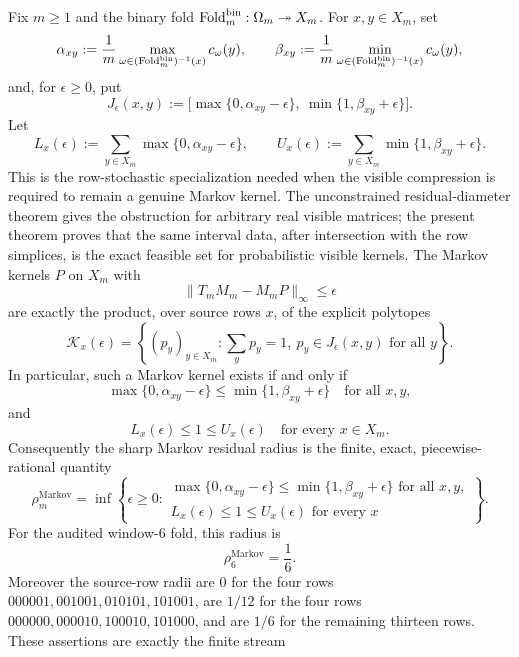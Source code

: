 \begin{theorem}\label{thm:foldbin-stochastic-budget-classification}
Fix \(m\ge1\) and the binary fold \(\operatorname{Fold}_m^{\mathrm{bin}}:\Omega_m\twoheadrightarrow X_m\).  For \(x,y\in X_m\), set
\[
\alpha_{xy}:=\frac{1}{m}\max_{\omega\in(\operatorname{Fold}_m^{\mathrm{bin}})^{-1}(x)}c_\omega(y),
\qquad
\beta_{xy}:=\frac{1}{m}\min_{\omega\in(\operatorname{Fold}_m^{\mathrm{bin}})^{-1}(x)}c_\omega(y),
\]
and, for \(\epsilon\ge0\), put
\[
J_\epsilon(x,y):=
\bigl[\max\{0,\alpha_{xy}-\epsilon\},\ \min\{1,\beta_{xy}+\epsilon\}\bigr].
\]
Let
\[
L_x(\epsilon):=\sum_{y\in X_m}\max\{0,\alpha_{xy}-\epsilon\},
\qquad
U_x(\epsilon):=\sum_{y\in X_m}\min\{1,\beta_{xy}+\epsilon\}.
\]
This is the row-stochastic specialization needed when the visible compression is required to remain a genuine Markov kernel.  The unconstrained residual-diameter theorem gives the obstruction for arbitrary real visible matrices; the present theorem proves that the same interval data, after intersection with the row simplices, is the exact feasible set for probabilistic visible kernels.  The Markov kernels \(P\) on \(X_m\) with
\[
\|T_mM_m-M_mP\|_\infty\le\epsilon
\]
are exactly the product, over source rows \(x\), of the explicit polytopes
\[
\mathcal K_x(\epsilon)=
\left\{(p_y)_{y\in X_m}:
\sum_y p_y=1,
\ p_y\in J_\epsilon(x,y)\text{ for all }y
\right\}.
\]
In particular, such a Markov kernel exists if and only if
\[
\max\{0,\alpha_{xy}-\epsilon\}\le \min\{1,\beta_{xy}+\epsilon\}
\quad\text{for all }x,y,
\]
and
\[
L_x(\epsilon)\le1\le U_x(\epsilon)
\quad\text{for every }x\in X_m.
\]
Consequently the sharp Markov residual radius is the finite, exact, piecewise-rational quantity
\[
\rho_m^{\mathrm{Markov}}=
\inf\left\{\epsilon\ge0:
\begin{array}{l}
\max\{0,\alpha_{xy}-\epsilon\}\le \min\{1,\beta_{xy}+\epsilon\}\text{ for all }x,y,\\[2pt]
L_x(\epsilon)\le1\le U_x(\epsilon)\text{ for every }x
\end{array}
\right\}.
\]
For the audited window-\(6\) fold, this radius is
\[
\rho_6^{\mathrm{Markov}}=\frac16.
\]
Moreover the source-row radii are \(0\) for the four rows
\(000001,001001,010101,101001\), are \(1/12\) for the four rows
\(000000,000010,100010,101000\), and are \(1/6\) for the remaining thirteen rows.
These assertions are exactly the finite stream
\begin{center}
\begin{minipage}{0.92\linewidth}
\begin{Verbatim}[breaklines=true,breakanywhere=true,fontsize=\scriptsize]

\end{Verbatim}
\end{minipage}
\end{center}
\end{theorem}
